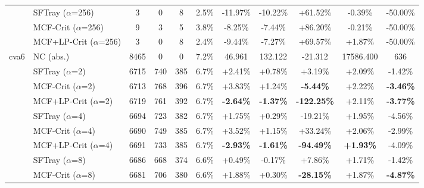 \begin{table}[t]
{\begin{tabular}{ll|cccc|ccc|cc}
\addlinespace[0.5em]

 & SFTray ($\alpha$=256) & 3 & 0 & 8 & 2.5\% & -11.97\% & -10.22\% & +61.52\% & -0.39\% & -50.00\% \\

 & MCF-Crit ($\alpha$=256) & 9 & 3 & 5 & 3.8\% & -8.25\% & -7.44\% & +86.20\% & -0.21\% & -50.00\% \\

 & MCF+LP-Crit ($\alpha$=256) & 3 & 0 & 8 & 2.4\% & -9.44\% & -7.27\% & +69.57\% & +1.87\% & -50.00\% \\

\midrule

\multirow{25}{*}{cva6} & NC (abs.) & 8465 & 0 & 0 & 7.2\% & 46.961 & 132.122 & -21.312 & 17586.400 & 636 \\

\addlinespace[0.4em]

 & SFTray ($\alpha$=2) & 6715 & 740 & 385 & 6.7\% & +2.41\% & +0.78\% & +3.19\% & +2.09\% & -1.42\% \\

 & MCF-Crit ($\alpha$=2) & 6713 & 768 & 396 & 6.7\% & +3.83\% & +1.24\% & \textbf{-5.44\%} & +2.22\% & \textbf{-3.46\%} \\

 & MCF+LP-Crit ($\alpha$=2) & 6719 & 761 & 392 & 6.7\% & \textbf{-2.64\%} & \textbf{-1.37\%} & \textbf{-122.25\%} & +2.11\% & \textbf{-3.77\%} \\

\addlinespace[0.5em]

 & SFTray ($\alpha$=4) & 6694 & 723 & 382 & 6.7\% & +1.75\% & +0.29\% & -19.21\% & +1.95\% & -4.56\% \\

 & MCF-Crit ($\alpha$=4) & 6690 & 749 & 385 & 6.7\% & +3.52\% & +1.15\% & +33.24\% & +2.06\% & -2.99\% \\

 & MCF+LP-Crit ($\alpha$=4) & 6691 & 733 & 385 & 6.7\% & \textbf{-2.93\%} & \textbf{-1.61\%} & \textbf{-94.49\%} & \textbf{+1.93\%} & -4.09\% \\

\addlinespace[0.5em]

 & SFTray ($\alpha$=8) & 6686 & 668 & 374 & 6.6\% & +0.49\% & -0.17\% & +7.86\% & +1.71\% & -1.42\% \\

 & MCF-Crit ($\alpha$=8) & 6681 & 706 & 380 & 6.6\% & +1.88\% & +0.30\% & \textbf{-28.15\%} & +1.87\% & \textbf{-4.87\%} \\


\end{tabular}}
\end{table}

